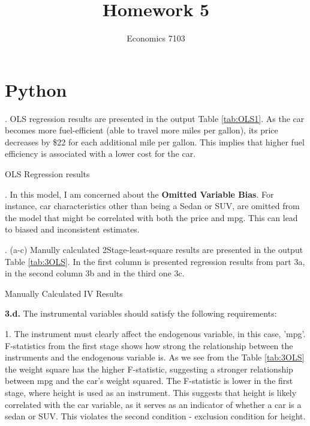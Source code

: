 \documentclass{article}
\title{Homework 5}
\author{Economics 7103}
\begin{document}
  
\maketitle

\section{Python}
. OLS regression results are presented in the output Table \ref{tab:OLS1}. As the car becomes more fuel-efficient (able to travel more miles per gallon), its price decreases by \$22 for each additional mile per gallon. This implies that higher fuel efficiency is associated with a lower cost for the car.

\begin{table}[h]
    \centering
    
    \caption{OLS Regression results}
    \label{tab:OLS1}
\end{table}

. In this model, I am concerned about the \textbf{Omitted Variable Bias}. For instance, car characteristics other than being a Sedan or SUV, are omitted from the model that might be correlated with both the price and mpg. This can lead to biased and inconsistent estimates. 

\clearpage

. (a-c) Manully calculated 2Stage-least-square results are presented in the output Table \ref{tab:3OLS}. In the first column is presented regression results from part 3a, in the second column 3b and in the third one 3c. 

\begin{table}[h]
    \centering
    
    \caption{Manually Calculated IV Results}
    \label{tab:3OLS}
\end{table}

\noindent \textbf{3.d.} The instrumental variables should satisfy the following requirements: 

1. The instrument must clearly affect the endogenous variable, in this case, 'mpg'. F-statistics from the first stage shows how strong the relationship between the instruments and the endogenous variable is. As we see from the Table \ref{tab:3OLS} the weight square has the higher F-statistic, suggesting a stronger relationship between mpg and the car's weight squared. The F-statistic is lower in the first stage, where height is used as an instrument. This suggests that height is likely correlated with the car variable, as it serves as an indicator of whether a car is a sedan or SUV. This violates the second condition - exclusion condition for height. 
\end{document}

